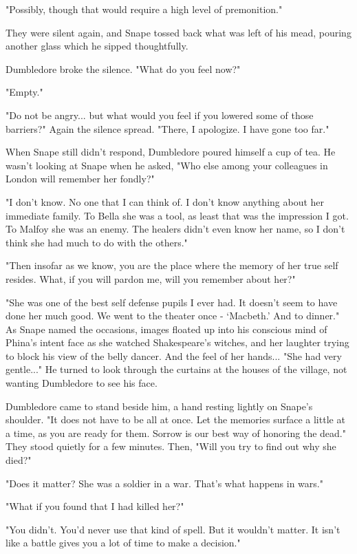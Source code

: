 \documentclass[a4paper,11pt]{article}
\begin{document}
"Possibly, though that would require a high level of premonition."

They were silent again, and Snape tossed back what was left of his mead, pouring another glass which he sipped thoughtfully.

Dumbledore broke the silence. "What do you feel now?"

"Empty."

"Do not be angry... but what would you feel if you lowered some of those barriers?" Again the silence spread. "There, I apologize. I have gone too far."

When Snape still didn't respond, Dumbledore poured himself a cup of tea. He wasn't looking at Snape when he asked, "Who else among your colleagues in London will remember her fondly?"

"I don't know. No one that I can think of. I don't know anything about her immediate family. To Bella she was a tool, as least that was the impression I got. To Malfoy she was an enemy. The healers didn't even know her name, so I don't think she had much to do with the others."

"Then insofar as we know, you are the place where the memory of her true self resides. What, if you will pardon me, will you remember about her?"

"She was one of the best self defense pupils I ever had. It doesn't seem to have done her much good. We went to the theater once - `Macbeth.' And to dinner." As Snape named the occasions, images floated up into his conscious mind of Phina's intent face as she watched Shakespeare's witches, and her laughter trying to block his view of the belly dancer. And the feel of her hands... "She had very gentle..." He turned to look through the curtains at the houses of the village, not wanting Dumbledore to see his face.

Dumbledore came to stand beside him, a hand resting lightly on Snape's shoulder. "It does not have to be all at once. Let the memories surface a little at a time, as you are ready for them. Sorrow is our best way of honoring the dead." They stood quietly for a few minutes. Then, "Will you try to find out why she died?"

"Does it matter? She was a soldier in a war. That's what happens in wars."

"What if you found that I had killed her?"

"You didn't. You'd never use that kind of spell. But it wouldn't matter. It isn't like a battle gives you a lot of time to make a decision."
\end{document}
